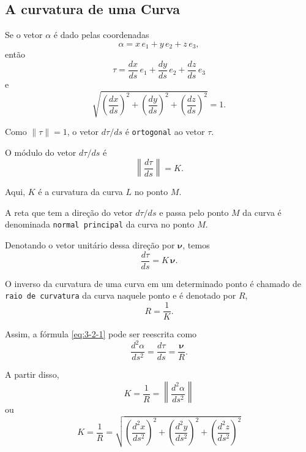 \subsection{A curvatura de uma Curva}

Se o vetor \(\alpha\) é dado pelas coordenadas
\begin{equation*}
	\alpha = x\,e_{1} + y\,e_{2} + z\, e_{3},
\end{equation*}
então
\begin{equation*}
	\tau = \dfrac{dx}{ds}\, e_{1} + \dfrac{dy}{ds}\, e_{2} + \dfrac{dz}{ds}\,e_{3}
\end{equation*}
e
\begin{equation*}
	\sqrt{\left(\dfrac{dx}{ds}\right)^{2}+\left(\dfrac{dy}{ds}\right)^{2}+\left(\dfrac{dz}{ds}\right)^{2}}=1.
\end{equation*}

Como \(\|\tau\| = 1\), o vetor \(d\tau/ds\) é \texttt{ortogonal} ao vetor \(\tau\).

O módulo do vetor \(d\tau/ds\) é
\begin{equation*}
	\left\|\dfrac{d\tau}{ds}\right\| = K.
\end{equation*}

Aqui, \(K\) é a curvatura da curva \(L\) no ponto \(M\).

A reta que tem a direção do vetor \(d\tau/ds\) e passa pelo ponto \(M\) da curva é denominada 
\texttt{normal principal} da curva no ponto \(M\).

Denotando o vetor unitário dessa direção por \(\boldsymbol{\nu}\), temos
\begin{equation}\label{eq:3-2-1}
	\dfrac{d\tau}{ds}= K\, \boldsymbol{\nu}.
\end{equation}

O inverso da curvatura de uma curva em um determinado ponto
é chamado de \texttt{raio de curvatura} da curva naquele ponto
e é denotado por \(R\),
\begin{equation*}
R=\dfrac{1}{K}.
\end{equation*}

Assim, a fórmula \eqref{eq:3-2-1} pode ser reescrita como
\begin{equation*}
\dfrac{d^{2}\alpha}{ds^{2}}=\dfrac{d\tau}{ds}=\dfrac{\boldsymbol{\nu}}{R}.
\end{equation*}

A partir disso,
\begin{equation*}
K=\dfrac{1}{R}=\left\|\dfrac{d^{2}\alpha}{ds^{2}}\right\|
\end{equation*}
ou
\begin{equation}\label{eq:3-2-2}
K=\dfrac{1}{R}=\sqrt{\left(\dfrac{d^{2}x}{ds^{2}}\right)^{2}+\left(\dfrac{d^{2}y}{ds^{2}}\right)^{2}+\left(\dfrac{d^{2}z}{ds^{2}}\right)^{2}}
\end{equation}

